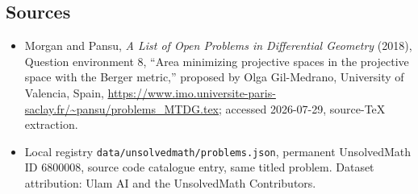 \documentclass[11pt]{article}
\begin{document}
\subsection{Sources}
\begin{itemize}
\item Morgan and Pansu, \emph{A List of Open Problems in Differential Geometry} (2018), Question environment 8, ``Area minimizing projective spaces in the projective space with the Berger metric,'' proposed by Olga Gil-Medrano, University of Valencia, Spain, \url{https://www.imo.universite-paris-saclay.fr/~pansu/problems_MTDG.tex}; accessed 2026-07-29, source-TeX extraction.
\item Local registry \texttt{data/unsolvedmath/problems.json}, permanent UnsolvedMath ID $6800008$, source code catalogue entry, same titled problem. Dataset attribution: Ulam AI and the UnsolvedMath Contributors.
\end{itemize}
\end{document}
